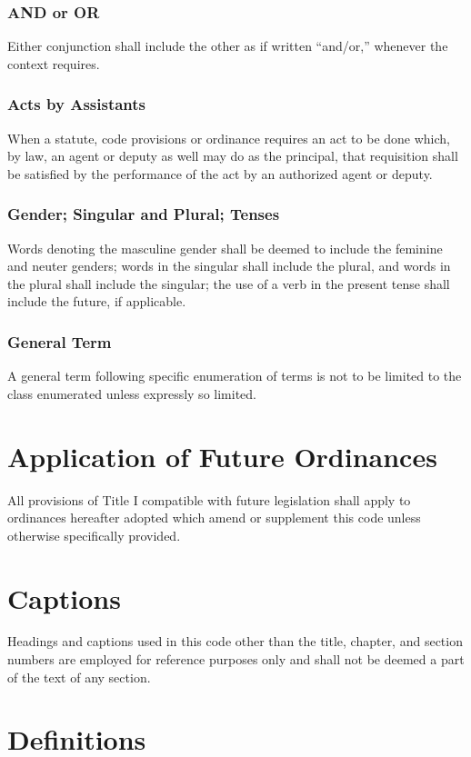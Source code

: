 \subsubsection{AND or OR}
Either conjunction shall include the other as if written “and/or,” whenever the context requires.
\subsubsection{Acts by Assistants}
When a statute, code provisions or ordinance requires an act to be done which, by law, an agent or deputy as well may do as the principal, that requisition shall be satisfied by the performance of the act by an authorized agent or deputy.
\subsubsection{Gender; Singular and Plural; Tenses}
Words denoting the masculine gender shall be deemed to include the feminine and neuter genders; words in the singular shall include the plural, and words in the plural shall include the singular; the use of a verb in the present tense shall include the future, if applicable.
\subsubsection{General Term}
A general term following specific enumeration of terms is not to be limited to the class enumerated unless expressly so limited.


\section{Application of Future Ordinances}
All provisions of Title I compatible with future legislation shall apply to ordinances hereafter adopted which amend or supplement this code unless otherwise specifically provided.


\section{Captions}
Headings and captions used in this code other than the title, chapter, and section numbers are employed for reference purposes only and shall not be deemed a part of the text of any section.


\section{Definitions}

